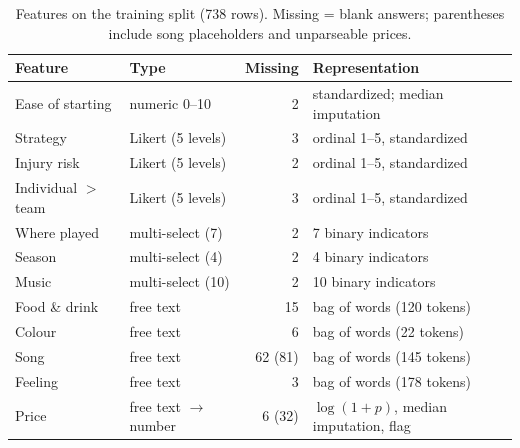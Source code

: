 \documentclass[11pt,titlepage]{article}
\begin{document}
\begin{table}[h]
\centering\footnotesize
\begin{tabular}{@{}llrl@{}}
\toprule
Feature & Type & Missing & Representation\\
\midrule
Ease of starting   & numeric 0--10      & 2  & standardized; median imputation        \\
Strategy           & Likert (5 levels)  & 3  & ordinal 1--5, standardized             \\
Injury risk        & Likert (5 levels)  & 2  & ordinal 1--5, standardized             \\
Individual $>$ team & Likert (5 levels)  & 3  & ordinal 1--5, standardized            \\
Where played       & multi-select (7)   & 2  & 7 binary indicators                    \\
Season             & multi-select (4)   & 2  & 4 binary indicators                    \\
Music              & multi-select (10)  & 2  & 10 binary indicators                   \\
Food \& drink      & free text          & 15 & bag of words (120 tokens)              \\
Colour             & free text          & 6  & bag of words (22 tokens)               \\
Song               & free text          & 62 (81) & bag of words (145 tokens)         \\
Feeling            & free text          & 3  & bag of words (178 tokens)              \\
Price              & free text $\to$ number & 6 (32) & $\log(1+p)$, median imputation, flag \\
\bottomrule
\end{tabular}
\caption{Features on the training split (738 rows). Missing = blank answers; parentheses include song placeholders and unparseable prices.}
\label{tab:features}
\vspace{-1em}
\end{table}
\end{document}
